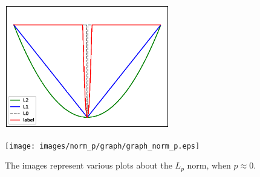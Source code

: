 \begin{figure}[htbp]
\vspace{-15pt}
	\begin{minipage}[b]{0.5\hsize}
		\centering
		\includegraphics[width=72mm, height = 54mm]{images/norm_p/graph/graph_norm.eps}
		 \label{fig:nom_p/comparison}
	\end{minipage}
	\begin{minipage}[b]{0.5\hsize}
		\centering
		\texttt{[image: images/norm\_p/graph/graph\_norm\_p.eps]}
		 \label{fig:nom_p/graph_norm_p}
	\end{minipage}
	\caption{The images represent various plots about the $L_{p}$ norm, when $p \approx 0$.}
	\label{fig:graph_lp}
\end{figure}
